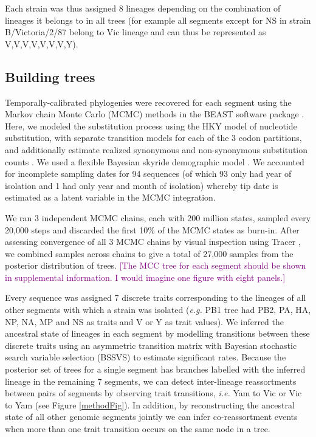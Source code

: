 \documentclass[11pt,oneside,letterpaper]{article}
\def\tbc#1{\textcolor{purple}{[#1]}}
\begin{document}
Each strain was thus assigned 8 lineages depending on the combination of lineages it belongs to in all trees (for example all segments except for NS in strain B/Victoria/2/87 belong to Vic lineage and can thus be represented as V,V,V,V,V,V,V,Y). 

\subsection*{Building trees}
Temporally-calibrated phylogenies were recovered for each segment using the Markov chain Monte Carlo (MCMC) methods in the BEAST software package \cite{drummond2012}.
Here, we modeled the substitution process using the HKY model of nucleotide substitution, with separate transition models for each of the 3 codon partitions, and additionally estimate realized synonymous and non-synonymous substitution counts \cite{obrien2009}.
We used a flexible Bayesian skyride demographic model \cite{minin2008}.
We accounted for incomplete sampling dates for 94 sequences (of which 93 only had year of isolation and 1 had only year and month of isolation) whereby tip date is estimated as a latent variable in the MCMC integration.

We ran 3 independent MCMC chains, each with 200 million states, sampled every 20,000 steps and discarded the first 10\% of the MCMC states as burn-in.
After assessing convergence of all 3 MCMC chains by visual inspection using Tracer \cite{tracer}, we combined samples across chains to give a total of 27,000 samples from the posterior distribution of trees.
\tbc{The MCC tree for each segment should be shown in supplemental information.  I would imagine one figure with eight panels.}

Every sequence was assigned 7 discrete traits corresponding to the lineages of all other segments with which a strain was isolated (\textit{e.g.} PB1 tree had PB2, PA, HA, NP, NA, MP and NS as traits and V or Y as trait values).
We inferred the ancestral state of lineages in each segment by modelling transitions between these discrete traits using an asymmetric transition matrix \cite{lemey2009} with Bayesian stochastic search variable selection (BSSVS) to estimate significant rates. Because the posterior set of trees for a single segment has branches labelled with the inferred lineage in the remaining 7 segments, we can detect inter-lineage reassortments between pairs of segments by observing trait transitions, \textit{i.e.} Yam to Vic or Vic to Yam (see Figure \ref{methodFig}). 
In addition, by reconstructing the ancestral state of all other genomic segments jointly we can infer co-reassortment events when more than one trait transition occurs on the same node in a tree.
\end{document}
